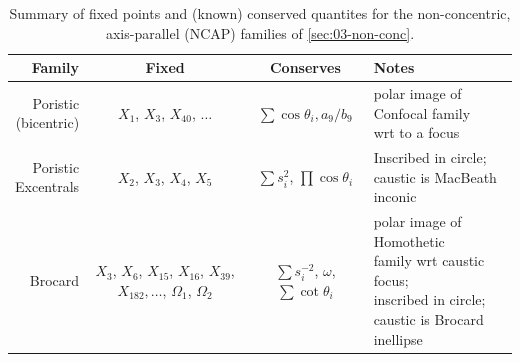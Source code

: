 \begin{table}
\centering
\begin{tabular}{|r|c|c|l|}
\hline
Family & Fixed & Conserves & Notes \\
\hline
\makecell[rc]{Poristic\\(bicentric)} & $X_1$, $X_3$, $X_{40}$, $\ldots$ & $\sum\cos\theta_i,a_9/b_9$ & \makecell[lc]{polar image of Confocal family\\wrt to a focus} \\
\hline
\makecell[rt]{Poristic\\Excentrals} & $X_2$, $X_3$, $X_4$, $X_5$ & $\sum{s_i^2}$, $\prod\cos\theta_i$ & \makecell[lt]{Inscribed in circle;\\caustic is MacBeath inconic} \\
\hline
Brocard & \makecell[lc]{$X_3$, $X_6$, $X_{15}$, $X_{16}$,\\$X_{39}$, $X_{182},\ldots$,\\$\Omega_1$, $\Omega_2$} & $\sum{s_i^{-2}}$, $\omega$, $\sum\cot\theta_i$ & \makecell[lc]{polar image of Homothetic\\family wrt caustic focus;\\inscribed in circle;\\caustic is Brocard inellipse}\\
\hline
\end{tabular}
\caption{Summary of fixed points and (known) conserved quantites for the non-concentric, axis-parallel (NCAP) families of \cref{sec:03-non-conc}.}
\label{tab:n3-non-conc-families}
\end{table}



